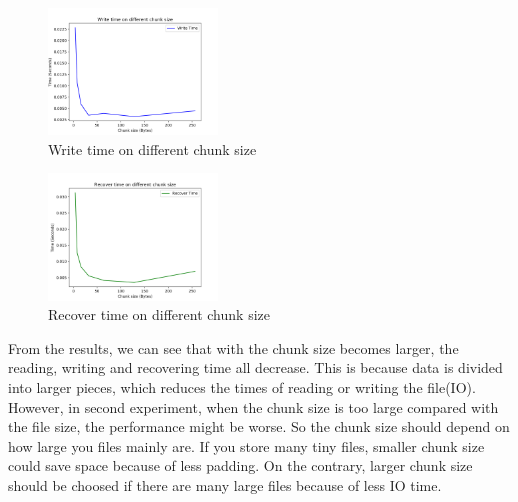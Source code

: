 \documentclass[journal]{IEEEtran}
\begin{document}
\begin{figure}[H]

	\centering

	\captionsetup{justification=centering}

	\includegraphics[width=0.4\textwidth]{fig/result_write_small.png}

	\caption{Write time on different chunk size}

\end{figure}


\begin{figure}[H]

	\centering

	\captionsetup{justification=centering}

	\includegraphics[width=0.4\textwidth]{fig/result_recover_small.png}

	\caption{Recover time on different chunk size}

\end{figure}


From the results, we can see that with the chunk size becomes larger, the reading, writing and recovering time all decrease. This is because data is divided into larger pieces, which reduces the times of reading or writing the file(IO). However, in second experiment, when the chunk size is too large compared with the file size, the performance might be worse. So the chunk size should depend on how large you files mainly are. If you store many tiny files, smaller chunk size could save space because of less padding. On the contrary, larger chunk size should be choosed if there are many large files because of less IO time.
\end{document}
